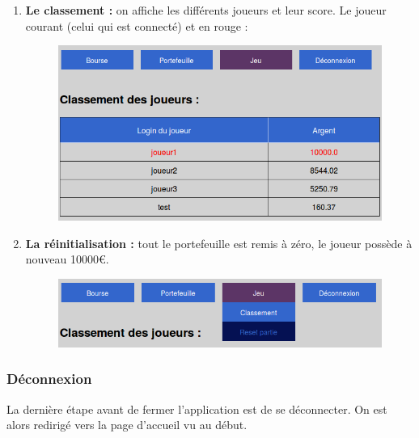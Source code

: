     \begin{enumerate}
     \item \textbf{Le classement :} on affiche les différents joueurs et leur score. Le joueur courant (celui qui est connecté) et en rouge :
     \begin{figure}[H]
	\center
	\includegraphics[scale=0.5]{../graph/8-jeuclassement.png}
      \end{figure} 
     \item \textbf{La réinitialisation :} tout le portefeuille est remis à zéro, le joueur possède à nouveau 10000€.
      \begin{figure}[H]
	\center
	\includegraphics[scale=0.5]{../graph/8-jeuresetpartie.png}
      \end{figure} 
    \end{enumerate}
  
    \subsubsection{Déconnexion}
    La dernière étape avant de fermer l'application est de se déconnecter. On est alors redirigé vers la page d'accueil vu au début.
